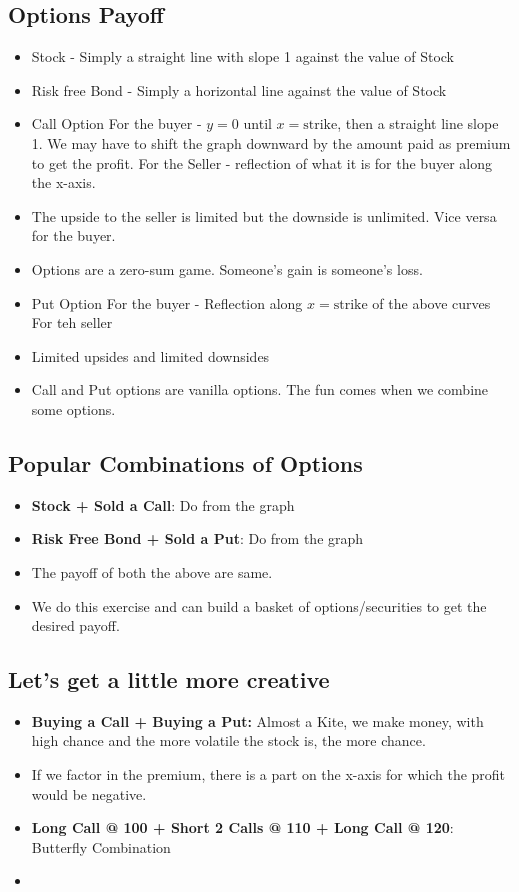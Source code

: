 \documentclass{article}
\begin{document}
\subsection{Options Payoff}
\begin{itemize}
    \item Stock - Simply a straight line with slope 1 against the value of Stock
    \item Risk free Bond - Simply a horizontal line against the value of Stock
    \item Call Option  
    \subitem For the buyer - $y = 0$ until $x = \text{strike}$, then a straight line slope 1. We may have to shift the graph downward by the amount paid as premium to get the profit.
    \subitem For the Seller - reflection of what it is for the buyer along the x-axis.
    \item The upside to the seller is limited but the downside is unlimited. Vice versa for the buyer.
    \item Options are a zero-sum game. Someone's gain is someone's loss.
    \item Put Option
    \subitem For the buyer - Reflection along $x = \text{strike}$ of the above curves
    \subitem For teh seller 
    \item Limited upsides and limited downsides
    \item Call and Put options are vanilla options. The fun comes when we combine some options.
\end{itemize}

\subsection{Popular Combinations of Options}
\begin{itemize}
    \item \textbf{Stock + Sold a Call}: Do from the graph
    \item \textbf{Risk Free Bond + Sold a Put}: Do from the graph
    \item The payoff of both the above are same.
    \item We do this exercise and can build a basket of options/securities to get the desired payoff.
\end{itemize}

\subsection{Let's get a little more creative}
\begin{itemize}
    \item \textbf{Buying a Call + Buying a Put:}  Almost a Kite, we make money, with high chance and the more volatile the stock is, the more chance.
    \item If we factor in the premium, there is a part on the x-axis for which the profit would be negative.
    \item \textbf{Long Call @ 100 + Short 2 Calls @ 110 + Long Call @ 120}: Butterfly Combination
    \item 
\end{itemize}
\end{document}
